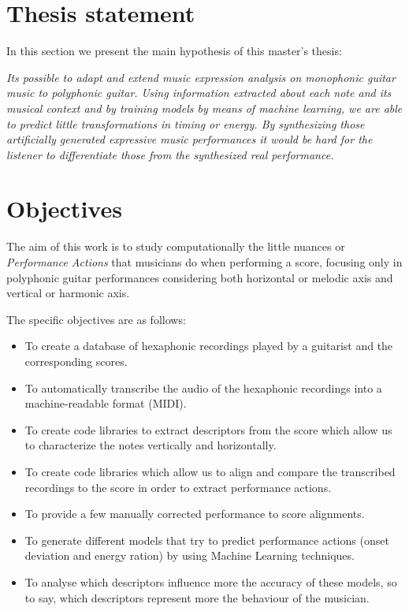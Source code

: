 \section{Thesis statement}
In this section we present the main hypothesis of this master's thesis:

\textit{Its possible to adapt and extend music expression analysis on monophonic guitar music to polyphonic guitar. Using information extracted about each note and its musical context and by training models by means of machine learning, we are able to predict little transformations in timing or energy. By synthesizing those artificially generated expressive music performances it would be hard for the listener to differentiate those from the synthesized real performance.}

\section{Objectives}
The aim of this work is to study computationally the little nuances or \textit{Performance Actions} that musicians do when performing a score, focusing only in polyphonic guitar performances considering both horizontal or melodic axis and vertical or harmonic axis.

The specific objectives are as follows:

\begin{itemize}[noitemsep]
\item To create a database of hexaphonic recordings played by a guitarist and the corresponding scores.
\item To automatically transcribe the audio of the hexaphonic recordings into a machine-readable format (MIDI).
\item To create code libraries to extract descriptors from the score which allow us to characterize the notes vertically and horizontally.
\item To create code libraries which allow us to align and compare the transcribed recordings to the score in order to extract performance actions.
\item To provide a few manually corrected performance to score alignments.
\item To generate different models that try to predict performance actions (onset deviation and energy ration) by using Machine Learning techniques.
\item To analyse which descriptors influence more the accuracy of these models, so to say, which descriptors represent more the behaviour of the musician.
\end{itemize}

